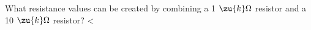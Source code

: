         What resistance values can be created by combining a
        1 $\zu{k}\Omega$ resistor and a 10 $\zu{k}\Omega$ resistor?
        <%
